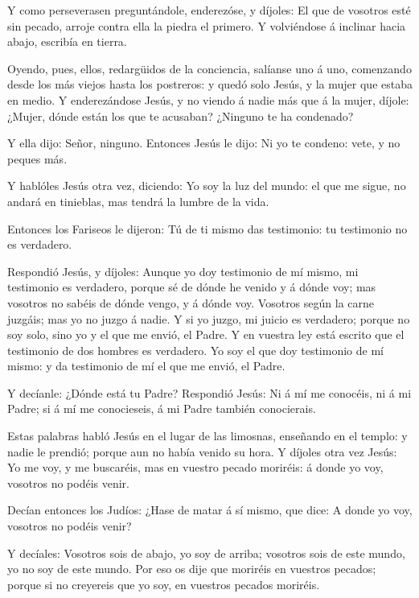  Y como perseverasen preguntándole, enderezóse, y díjoles:
El que de vosotros esté sin pecado, arroje contra ella la piedra el
primero.  Y volviéndose á inclinar hacia abajo, escribía en
tierra.

 Oyendo, pues, ellos, redargüidos de la conciencia, salíanse
uno á uno, comenzando desde los más viejos hasta los postreros: y quedó
solo Jesús, y la mujer que estaba en medio.  Y
enderezándose Jesús, y no viendo á nadie más que á la mujer, díjole:
¿Mujer, dónde están los que te acusaban? ¿Ninguno te ha condenado?

 Y ella dijo: Señor, ninguno. Entonces Jesús le dijo: Ni yo
te condeno: vete, y no peques más.

 Y hablóles Jesús otra vez, diciendo: Yo soy la luz del
mundo: el que me sigue, no andará en tinieblas, mas tendrá la lumbre de
la vida.

 Entonces los Fariseos le dijeron: Tú de ti mismo das
testimonio: tu testimonio no es verdadero.

 Respondió Jesús, y díjoles: Aunque yo doy testimonio de mí
mismo, mi testimonio es verdadero, porque sé de dónde he venido y á
dónde voy; mas vosotros no sabéis de dónde vengo, y á dónde voy.
 Vosotros según la carne juzgáis; mas yo no juzgo á nadie.
 Y si yo juzgo, mi juicio es verdadero; porque no soy solo,
sino yo y el que me envió, el Padre.  Y en vuestra ley está
escrito que el testimonio de dos hombres es verdadero.  Yo
soy el que doy testimonio de mí mismo: y da testimonio de mí el que me
envió, el Padre.

 Y decíanle: ¿Dónde está tu Padre? Respondió Jesús: Ni á mí
me conocéis, ni á mi Padre; si á mí me conocieseis, á mi Padre también
conocierais.

 Estas palabras habló Jesús en el lugar de las limosnas,
enseñando en el templo: y nadie le prendió; porque aun no había venido
su hora.  Y díjoles otra vez Jesús: Yo me voy, y me
buscaréis, mas en vuestro pecado moriréis: á donde yo voy, vosotros no
podéis venir.

 Decían entonces los Judíos: ¿Hase de matar á sí mismo, que
dice: A donde yo voy, vosotros no podéis venir?

 Y decíales: Vosotros sois de abajo, yo soy de arriba;
vosotros sois de este mundo, yo no soy de este mundo.  Por
eso os dije que moriréis en vuestros pecados; porque si no creyereis que
yo soy, en vuestros pecados moriréis.

